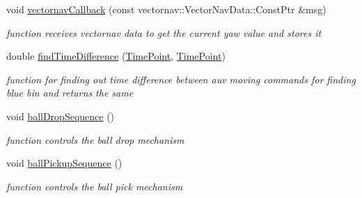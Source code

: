 \begin{DoxyCompactItemize}
void \hyperlink{classPathPlanner_a9b5d663206c906f2fc991153fea7bff0}{vectornav\+Callback} (const vectornav\+::\+Vector\+Nav\+Data\+::\+Const\+Ptr \&msg)
\begin{DoxyCompactList}\small\item\em function receives vectornav data to get the current yaw value and stores it \end{DoxyCompactList}\item 
double \hyperlink{classPathPlanner_a006986912bf894921948056bf8ed1b5a}{find\+Time\+Difference} (\hyperlink{thruster__driver_8cpp_ad3e807c387dc076de974ff7eac67ad81}{Time\+Point}, \hyperlink{thruster__driver_8cpp_ad3e807c387dc076de974ff7eac67ad81}{Time\+Point})
\begin{DoxyCompactList}\small\item\em function for finding out time difference between auv moving commands for finding blue bin and returns the same \end{DoxyCompactList}\item 
void \hyperlink{classPathPlanner_ac2818eba3b1035732ca548c87d12d30d}{ball\+Drop\+Sequence} ()
\begin{DoxyCompactList}\small\item\em function controls the ball drop mechanism \end{DoxyCompactList}\item 
void \hyperlink{classPathPlanner_a225c5c983e296b81c97c74b94ec2bea0}{ball\+Pickup\+Sequence} ()
\begin{DoxyCompactList}\small\item\em function controls the ball pick mechanism \end{DoxyCompactList}\end{DoxyCompactItemize}
